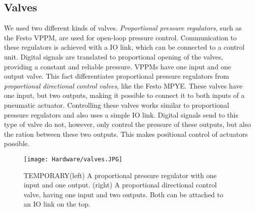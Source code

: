\subsection{Valves}
We used two different kinds of valves. \textit{Proportional pressure regulators}, such as the Festo VPPM, are used for open-loop pressure control. Communication to these regulators is achieved with a IO link, which can be connected to a control unit. Digital signals are translated to proportional opening of the valves, providing a constant and reliable pressure. VPPMs have one input and one output valve. This fact differentiates proportional pressure regulators from \textit{proportional directional control valves}, like the Festo MPYE. These valves have one input, but two outputs, making it possible to connect it to both inputs of a pneumatic actuator. Controlling these valves works similar to proportional pressure regulators and also uses a simple IO link. Digital signals send to this type of valve do not, however, only control the pressure of these outputs, but also the ration between these two outputs. This makes positional control of actuators possible.

\begin{figure}[h!]
    \texttt{[image: Hardware/valves.JPG]}
    \centering
    \caption{TEMPORARY(left) A proportional pressure regulator with one input and one output. (right) A proportional directional control valve, having one input and two outputs. Both can be attached to an IO link on the top.}
    \label{fig:valves}
\end{figure}

